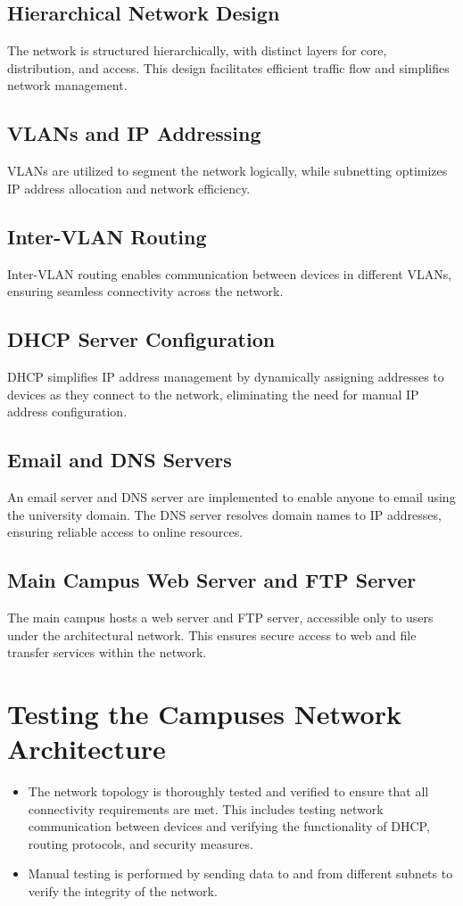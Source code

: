 \documentclass[12pt]{article}
\begin{document}
\subsection{Hierarchical Network Design}
The network is structured hierarchically, with distinct layers for core, distribution, and access. This design facilitates efficient traffic flow and simplifies network management.

\subsection{VLANs and IP Addressing}
VLANs are utilized to segment the network logically, while subnetting optimizes IP address allocation and network efficiency.

\subsection{Inter-VLAN Routing}
Inter-VLAN routing enables communication between devices in different VLANs, ensuring seamless connectivity across the network.

\subsection{DHCP Server Configuration}
DHCP simplifies IP address management by dynamically assigning addresses to devices as they connect to the network, eliminating the need for manual IP address configuration.

\subsection{Email and DNS Servers}
An email server and DNS server are implemented to enable anyone to email using the university domain. The DNS server resolves domain names to IP addresses, ensuring reliable access to online resources.

\subsection{Main Campus Web Server and FTP Server}
The main campus hosts a web server and FTP server, accessible only to users under the architectural network. This ensures secure access to web and file transfer services within the network.

\section{Testing the Campuses Network Architecture}
\begin{itemize}[label=--,leftmargin=*,parsep=0pt,itemsep=4pt]
    \item The network topology is thoroughly tested and verified to ensure that all connectivity requirements are met. This includes testing network communication between devices and verifying the functionality of DHCP, routing protocols, and security measures.
    \item Manual testing is performed by sending data to and from different subnets to verify the integrity of the network.
\end{itemize}
\end{document}
